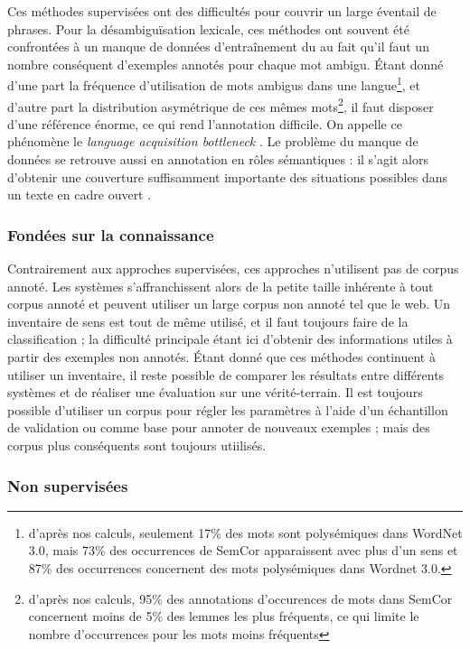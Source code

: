 Ces méthodes supervisées ont des difficultés pour couvrir un large éventail de phrases. Pour la désambiguïsation lexicale, ces méthodes ont souvent été confrontées à un manque de données d'entraînement du au fait qu'il faut un nombre conséquent d'exemples annotés pour chaque mot ambigu. Étant donné d'une part la fréquence d'utilisation de mots ambigus dans une langue\footnote{d'après nos calculs, seulement 17\% des mots sont polysémiques dans WordNet 3.0, mais 73\% des occurrences de SemCor apparaissent avec plus d'un sens et 87\% des occurrences concernent des mots polysémiques dans Wordnet 3.0.}, et d'autre part la distribution asymétrique de ces mêmes mots\footnote{d'après nos calculs, 95\% des annotations d'occurences de mots dans SemCor concernent moins de 5\% des lemmes les plus fréquents, ce qui limite le nombre d'occurrences pour les mots moins fréquents}, il faut disposer d'une référence énorme, ce qui rend l'annotation difficile. On appelle ce phénomène le \textit{language acquisition bottleneck} \citep{gale1992using}. Le problème du manque de données se retrouve aussi en annotation en rôles sémantiques : il s'agit alors d'obtenir une couverture suffisamment importante des situations possibles dans un texte en cadre ouvert \cite[p.~155]{marquez2008semantic}.

\subsubsection{Fondées sur la connaissance}

Contrairement aux approches supervisées, ces approches n'utilisent pas de corpus annoté. Les systèmes s'affranchissent alors de la petite taille inhérente à tout corpus annoté et peuvent utiliser un large corpus non annoté tel que le web. Un inventaire de sens est tout de même utilisé, et il faut toujours faire de la classification ; la difficulté principale étant ici d'obtenir des informations utiles à partir des exemples non annotés. Étant donné que ces méthodes continuent à utiliser un inventaire, il reste possible de comparer les résultats entre différents systèmes et de réaliser une évaluation sur une vérité-terrain. Il est toujours possible d'utiliser un corpus pour régler les paramètres à l'aide d'un échantillon de validation ou comme base pour annoter de nouveaux exemples ; mais des corpus plus conséquents sont toujours utiilisés.

\subsubsection{Non supervisées}

